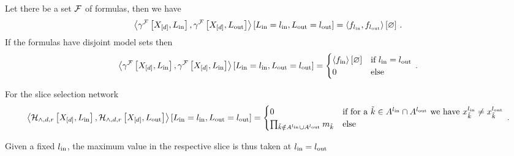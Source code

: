 \begin{example}
	Let there be a set $\mathcal{F}$ of formulas, then we have
	\begin{align*}
		\left\langle \gamma^{\mathcal{F}}\left[X_{[d]},L_{\mathrm{in}}\right],\gamma^{\mathcal{F}}\left[X_{[d]},L_{\mathrm{out}}\right]\right\rangle \left[ L_{\mathrm{in}}=l_{\mathrm{in}},L_{\mathrm{out}}=l_{\mathrm{out}} \right]
		= \left\langle f_{l_{\mathrm{in}}}, f_{l_{\mathrm{out}}}\right\rangle \left[ \varnothing \right] \, . 
	\end{align*}
	If the formulas have disjoint model sets then 
	\begin{align*}
		\left\langle \gamma^{\mathcal{F}}\left[X_{[d]},L_{\mathrm{in}}\right],\gamma^{\mathcal{F}}\left[X_{[d]},L_{\mathrm{in}}\right]\right\rangle \left[ L_{\mathrm{in}}=l_{\mathrm{in}},L_{\mathrm{out}}=l_{\mathrm{out}} \right]
		= \begin{cases}
			\left\langle f_{\mathrm{in}}\right\rangle \left[ \varnothing \right] & \text{if } l_{\mathrm{in}}=l_{\mathrm{out}} \\
			0 & \text{else} 
		\end{cases} \, . 
	\end{align*}
\end{example}


\begin{example}
	
	For the slice selection network
	\begin{align*}
		\left\langle \mathcal{H}_{\land,d,r}\left[X_{[d]},L_{\mathrm{in}}\right],\mathcal{H}_{\land,d,r}\left[X_{[d]},L_{\mathrm{out}}\right]\right\rangle \left[ L_{\mathrm{in}}=l_{\mathrm{in}},L_{\mathrm{out}}=l_{\mathrm{out}} \right]
		= \begin{cases}
			0 & \text{if for a }\tilde{k}\in A^{l_{\mathrm{in}}}\cap A^{l_{\mathrm{out}}}\text{ we have }x_{\tilde{k}}^{l_{\mathrm{in}}}\neq x_{\tilde{k}}^{l_{\mathrm{out}}} \\
			\prod_{\tilde{k}\notin A^{l_{\mathrm{in}}}\cup A^{l_{\mathrm{out}}}} m_{\tilde{k}}& \text{else} 
		\end{cases} \, . 
	\end{align*}

	Given a fixed $l_{\mathrm{in}}$, the maximum value in the respective slice is thus taken at $l_{\mathrm{in}}=l_{\mathrm{out}}$
\end{example}








